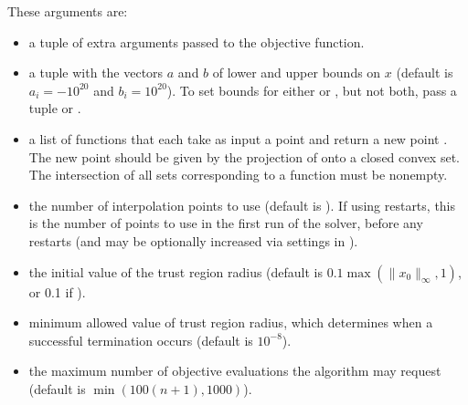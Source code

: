 \documentclass[letterpaper,10pt,english]{sphinxmanual}
\begin{document}
These arguments are:
\begin{itemize}
\item {} 
 \sphinxhyphen{} a tuple of extra arguments passed to the objective function.

\item {} 
 \sphinxhyphen{} a tuple  with the vectors \(a\) and \(b\) of lower and upper bounds on \(x\) (default is \(a_i=-10^{20}\) and \(b_i=10^{20}\)). To set bounds for either  or , but not both, pass a tuple  or .

\item {} 
 \sphinxhyphen{} a list \sphinxcode{\sphinxupquote{{[}f1,f2,...,fn{]}}} of functions that each take as input a point  and return a new point . The new point  should be given by the projection of  onto a closed convex set. The intersection of all sets corresponding to a function must be non\sphinxhyphen{}empty.

\item {} 
 \sphinxhyphen{} the number of interpolation points to use (default is ). If using restarts, this is the number of points to use in the first run of the solver, before any restarts (and may be optionally increased via settings in ).

\item {} 
 \sphinxhyphen{} the initial value of the trust region radius (default is \(0.1\max(\|x_0\|_{\infty}, 1)\), or 0.1 if ).

\item {} 
 \sphinxhyphen{} minimum allowed value of trust region radius, which determines when a successful termination occurs (default is \(10^{-8}\)).

\item {} 
 \sphinxhyphen{} the maximum number of objective evaluations the algorithm may request (default is \(\min(100(n+1),1000)\)).


\end{itemize}
\end{document}
